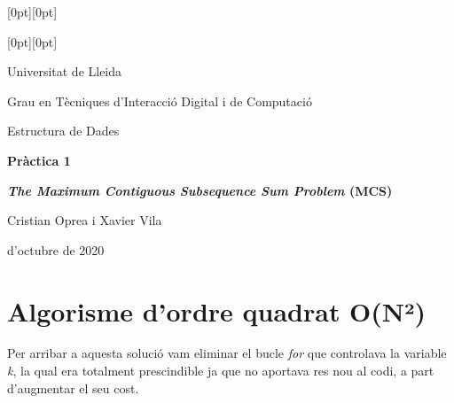 \documentclass[a4paper, 12pt]{article}
\begin{document}
\begin{titlepage}

\raisebox{-0.2em}[0pt][0pt]{%
}

\raisebox{1.9em}[0pt][0pt]{%
}

    \centering
    {\Large
    Universitat de Lleida\par
    Grau en Tècniques d'Interacció Digital i de Computació\par
    Estructura de Dades\par
}
    \vfill
    {\Huge\bfseries Pràctica 1\par}\vspace{3ex}
    {\Large\bfseries \textit{The Maximum Contiguous Subsequence Sum Problem} (MCS)\par}
\vspace{6ex}
{\Large
Cristian Oprea i Xavier Vila
\par}
\vfill
\parbox{.5\textwidth}{ d'octubre de 2020}
\end{titlepage}

\section{Algorisme d'ordre quadrat O(N²)}
Per arribar a aquesta solució vam eliminar el bucle \textit{for} que controlava la variable \textit{k}, la qual era totalment prescindible ja que no aportava res nou al codi, a part d'augmentar el seu cost.
\end{document}
